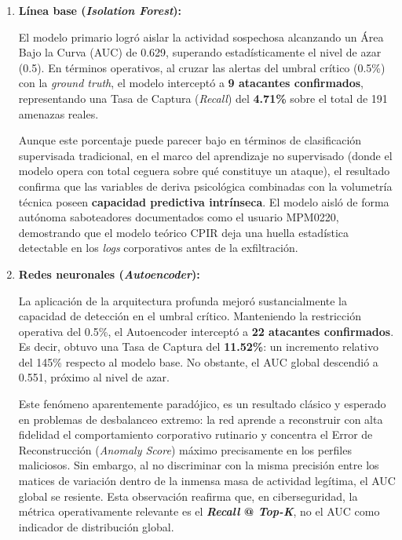 \documentclass[IB]{TFUOC}%
\begin{document}
\begin{enumerate}
    \item \textbf{Línea base (\textit{Isolation Forest}):}

    El modelo primario logró aislar la actividad sospechosa alcanzando un Área Bajo la Curva (AUC) de 0.629, superando estadísticamente el nivel de azar (0.5). En términos operativos, al cruzar las alertas del umbral crítico (0.5\%) con la \textit{ground truth}, el modelo interceptó a \textbf{9 atacantes confirmados}, representando una Tasa de Captura (\textit{Recall}) del \textbf{4.71\%} sobre el total de 191 amenazas reales.

    Aunque este porcentaje puede parecer bajo en términos de clasificación supervisada tradicional, en el marco del aprendizaje no supervisado (donde el modelo opera con total ceguera sobre qué constituye un ataque), el resultado confirma que las variables de deriva psicológica combinadas con la volumetría técnica poseen \textbf{capacidad predictiva intrínseca}. El modelo aisló de forma autónoma saboteadores documentados como el usuario MPM0220, demostrando que el modelo teórico CPIR deja una huella estadística detectable en los \textit{logs} corporativos antes de la exfiltración.

    \item \textbf{Redes neuronales (\textit{Autoencoder}):}

    La aplicación de la arquitectura profunda mejoró sustancialmente la capacidad de detección en el umbral crítico. Manteniendo la restricción operativa del 0.5\%, el Autoencoder interceptó a \textbf{22 atacantes confirmados}. Es decir, obtuvo una Tasa de Captura del \textbf{11.52\%}: un incremento relativo del 145\% respecto al modelo base. No obstante, el AUC global descendió a 0.551, próximo al nivel de azar.

    Este fenómeno aparentemente paradójico, es un resultado clásico y esperado en problemas de desbalanceo extremo: la red aprende a reconstruir con alta fidelidad el comportamiento corporativo rutinario y concentra el Error de Reconstrucción (\textit{Anomaly Score}) máximo precisamente en los perfiles maliciosos. Sin embargo, al no discriminar con la misma precisión entre los matices de variación dentro de la inmensa masa de actividad legítima, el AUC global se resiente. Esta observación reafirma que, en ciberseguridad, la métrica operativamente relevante es el \textbf{\textit{Recall} @ \textit{Top-K}}, no el AUC como indicador de distribución global.


\end{enumerate}
\end{document}
